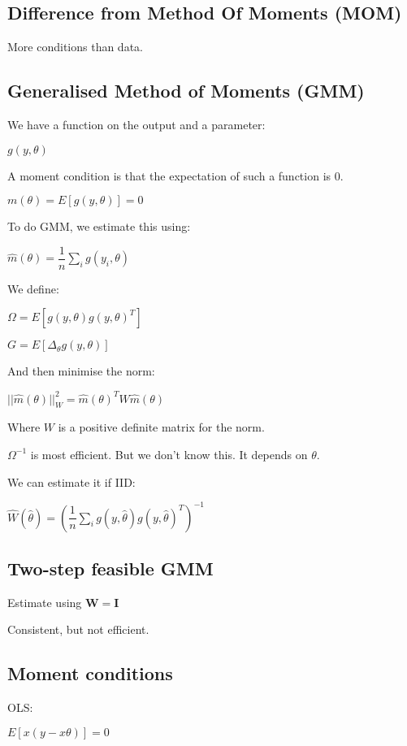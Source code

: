 
\subsection{Difference from Method Of Moments (MOM)}

More conditions than data.

\subsection{Generalised Method of Moments (GMM)}

We have a function on the output and a parameter:

\(g(y, \theta )\)

A moment condition is that the expectation of such a function is \(0\).

\(m(\theta )=E[g(y, \theta )]=0\)

To do GMM, we estimate this using:

\(\hat m(\theta )=\dfrac{1}{n}\sum_ig(y_i, \theta )\)

We define:

\(\Omega = E[g(y, \theta )g(y, \theta)^T]\)

\(G=E[\Delta_\theta g(y, \theta)]\)

And then minimise the norm:

\(||\hat m(\theta )||^2_W=\hat m(\theta )^TW\hat m(\theta )\)

Where \(W\) is a positive definite matrix for the norm.

\(\Omega ^{-1}\) is most efficient. But we don't know this. It depends on \(\theta \).

We can estimate it if IID:

\(\hat W(\hat \theta )= (\dfrac{1}{n}\sum_i g(y, \hat \theta)g(y, \hat \theta)^T)^{-1}\)

\subsection{Two-step feasible GMM}

Estimate using \(\mathbf W=\mathbf I\)

Consistent, but not efficient.

\subsection{Moment conditions}

OLS:

\(E[x(y-x\theta)]=0\)

